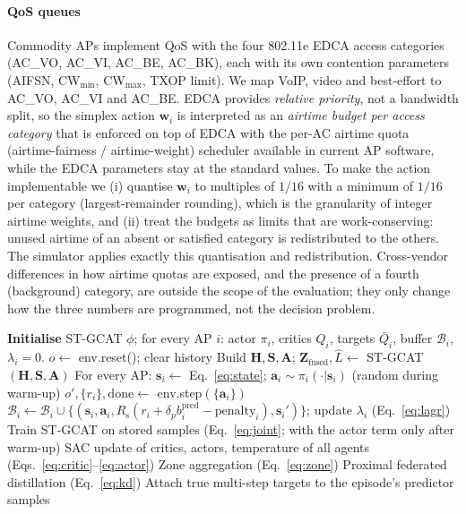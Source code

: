 \paragraph{QoS queues} Commodity APs implement QoS with the four 802.11e EDCA access categories (AC\_VO, AC\_VI, AC\_BE, AC\_BK), each with its own contention parameters (AIFSN, CW$_{\min}$, CW$_{\max}$, TXOP limit). We map VoIP, video and best-effort to AC\_VO, AC\_VI and AC\_BE. EDCA provides \emph{relative priority}, not a bandwidth split, so the simplex action $\mathbf{w}_i$ is interpreted as an \emph{airtime budget per access category} that is enforced on top of EDCA with the per-AC airtime quota (airtime-fairness / airtime-weight) scheduler available in current AP software, while the EDCA parameters stay at the standard values. To make the action implementable we (i) quantise $\mathbf{w}_i$ to multiples of $1/16$ with a minimum of $1/16$ per category (largest-remainder rounding), which is the granularity of integer airtime weights, and (ii) treat the budgets as limits that are work-conserving: unused airtime of an absent or satisfied category is redistributed to the others. The simulator applies exactly this quantisation and redistribution. Cross-vendor differences in how airtime quotas are exposed, and the presence of a fourth (background) category, are outside the scope of the evaluation; they only change how the three numbers are programmed, not the decision problem.

\begin{algorithm}[htbp]
\small
\caption{STAG-FedSAC training (one environment step shown; all APs act simultaneously).}\label{alg:main}
\begin{algorithmic}[1]
\State \textbf{Initialise} ST-GCAT $\phi$; for every AP $i$: actor $\pi_i$, critics $Q_i$, targets $\bar Q_i$, buffer $\mathcal{B}_i$, $\lambda_i=0$.
  \State $o\leftarrow$ env.reset(); clear history
    \State Build $\mathbf{H},\mathbf{S},\mathbf{A}$; $\mathbf{Z}_{\mathrm{fused}},\hat L\leftarrow$ ST-GCAT$(\mathbf{H},\mathbf{S},\mathbf{A})$
    \State For every AP: $\mathbf{s}_i\leftarrow$ Eq.~\eqref{eq:state}; $\mathbf{a}_i\sim\pi_i(\cdot|\mathbf{s}_i)$ (random during warm-up)
    \State $o',\{r_i\},\text{done}\leftarrow$ env.step$(\{\mathbf{a}_i\})$
    \State $\mathcal{B}_i\leftarrow\mathcal{B}_i\cup\{(\mathbf{s}_i,\mathbf{a}_i,R_{\mathrm{s}}(r_i+\delta_pb^{\mathrm{pred}}_i-\text{penalty}_i),\mathbf{s}_i')\}$; update $\lambda_i$ (Eq.~\ref{eq:lagr})
    \State Train ST-GCAT on stored samples (Eq.~\ref{eq:joint}; with the actor term only after warm-up)
      \State SAC update of critics, actors, temperature of all agents (Eqs.~\ref{eq:critic}--\ref{eq:actor})
    \EndIf
     \State Zone aggregation (Eq.~\ref{eq:zone}) \EndIf
     \State Proximal federated distillation (Eq.~\ref{eq:kd}) \EndIf
  \EndFor
  \State Attach true multi-step targets to the episode's predictor samples
\EndFor
\end{algorithmic}
\end{algorithm}
